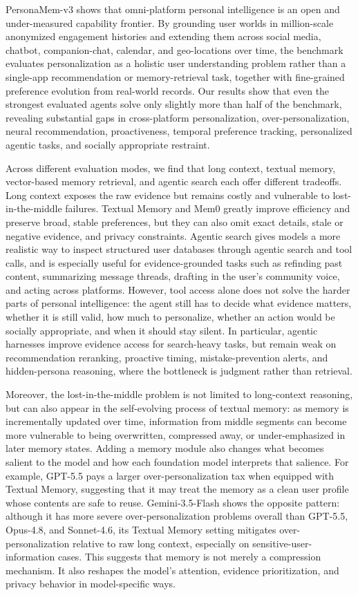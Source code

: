 \documentclass[]{fairmeta}
\begin{document}
PersonaMem-v3 shows that omni-platform personal intelligence is an open and under-measured capability frontier. By grounding user worlds in million-scale anonymized engagement histories and extending them across social media, chatbot, companion-chat, calendar, and geo-locations over time, the benchmark evaluates personalization as a holistic user understanding problem rather than a single-app recommendation or memory-retrieval task, together with fine-grained preference evolution from real-world records. Our results show that even the strongest evaluated agents solve only slightly more than half of the benchmark, revealing substantial gaps in cross-platform personalization, over-personalization, neural recommendation, proactiveness, temporal preference tracking, personalized agentic tasks, and socially appropriate restraint.

Across different evaluation modes, we find that long context, textual memory, vector-based memory retrieval, and agentic search each offer different tradeoffs. Long context exposes the raw evidence but remains costly and vulnerable to lost-in-the-middle failures. Textual Memory and Mem0 greatly improve efficiency and preserve broad, stable preferences, but they can also omit exact details, stale or negative evidence, and privacy constraints. Agentic search gives models a more realistic way to inspect structured user databases through agentic search and tool calls, and is especially useful for evidence-grounded tasks such as refinding past content, summarizing message threads, drafting in the user’s community voice, and acting across platforms. However, tool access alone does not solve the harder parts of personal intelligence: the agent still has to decide what evidence matters, whether it is still valid, how much to personalize, whether an action would be socially appropriate, and when it should stay silent. In particular, agentic harnesses improve evidence access for search-heavy tasks, but remain weak on recommendation reranking, proactive timing, mistake-prevention alerts, and hidden-persona reasoning, where the bottleneck is judgment rather than retrieval.

Moreover, the lost-in-the-middle problem is not limited to long-context reasoning, but can also appear in the self-evolving process of textual memory: as memory is incrementally updated over time, information from middle segments can become more vulnerable to being overwritten, compressed away, or under-emphasized in later memory states. Adding a memory module also changes what becomes salient to the model and how each foundation model interprets that salience. For example, GPT-5.5 pays a larger over-personalization tax when equipped with Textual Memory, suggesting that it may treat the memory as a clean user profile whose contents are safe to reuse. Gemini-3.5-Flash shows the opposite pattern: although it has more severe over-personalization problems overall than GPT-5.5, Opus-4.8, and Sonnet-4.6, its Textual Memory setting mitigates over-personalization relative to raw long context, especially on sensitive-user-information cases. This suggests that memory is not merely a compression mechanism. It also reshapes the model’s attention, evidence prioritization, and privacy behavior in model-specific ways.
\end{document}
